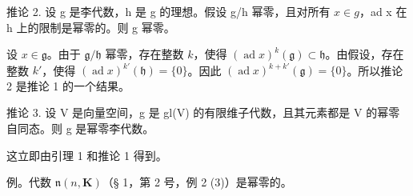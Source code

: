 推论 2. 设 g 是李代数，h 是 g 的理想。假设 g/h 幂零，且对所有 \(x \in g\)，ad x 在 h 上的限制是幂零的。则 g 幂零。

设 \(x \in \mathfrak{g}\)。由于 \(\mathfrak{g} / \mathfrak{h}\) 幂零，存在整数 \(k\)，使得 \((\operatorname{ad} x)^k(\mathfrak{g}) \subset \mathfrak{h}\)。由假设，存在整数 \(k'\)，使得 \((\operatorname{ad} x)^{k'}(\mathfrak{h}) = \{0\}\)。因此 \((\operatorname{ad} x)^{k + k'}(\mathfrak{g}) = \{0\}\)。所以推论 2 是推论 1 的一个结果。

推论 3. 设 V 是向量空间，g 是 gl(V) 的有限维子代数，且其元素都是 V 的幂零自同态。则 g 是幂零李代数。

这立即由引理 1 和推论 1 得到。

例。代数 \(\mathfrak{n}(n,\mathbf{K})\)（§ 1，第 2 号，例 2 (3)）是幂零的。

